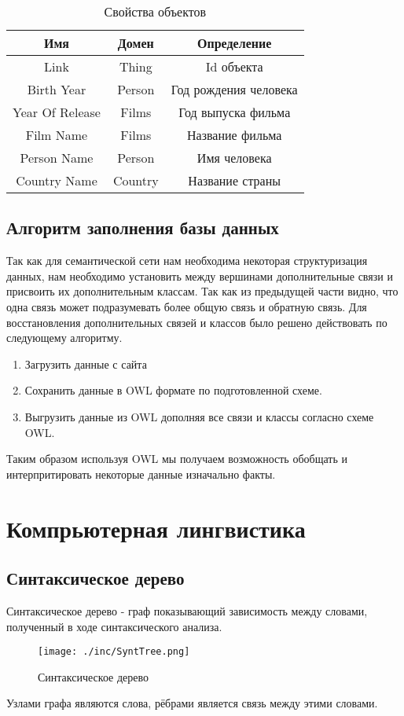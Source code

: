 \begin{table}[ht]
  \caption{Свойства объектов}
  \begin{tabular}{|c|c|c|}
  \hline
    Имя    & Домен & Определение\\
  \hline
  Link & Thing & Id объекта\\
  \hline
  Birth Year  & Person   & Год рождения человека\\  
  \hline
  Year Of Release & Films & Год выпуска фильма \\
  \hline
  Film Name & Films & Название фильма \\
  \hline
  Person Name & Person & Имя человека \\
  \hline
  Country Name & Country & Название страны \\ 
  \hline
  \end{tabular}
  \label{tab:tabular}
\end{table}
\subsection{Алгоритм заполнения базы данных}
Так как для семантической сети нам необходима некоторая структуризация данных, нам необходимо установить между вершинами дополнительные связи и присвоить их дополнительным классам. Так как из предыдущей части видно, что одна связь может подразумевать более общую связь и обратную связь.
Для восстановления дополнительных связей и классов было решено действовать по следующему алгоритму.
\begin{enumerate}
\item Загрузить данные с сайта
\item Сохранить данные в OWL формате по подготовленной схеме.
\item Выгрузить данные из OWL дополняя все связи и классы согласно схеме OWL.
\end{enumerate}
Таким образом используя OWL мы получаем возможность обобщать и интерпритировать некоторые данные изначально факты. 
\section{Компрьютерная лингвистика}
\subsection{Синтаксическое дерево}
Синтаксическое дерево - граф показывающий зависимость между словами, полученный в ходе синтаксического анализа. 
\begin{figure}
  \centering
  \texttt{[image: ./inc/SyntTree.png]}
  \caption{Синтаксическое дерево}
  \label{fig:fig04}
\end{figure}
Узлами графа являются слова, рёбрами является связь между этими словами.
